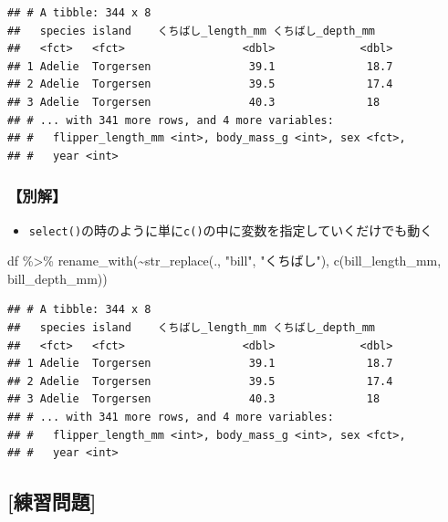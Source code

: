\documentclass[
  xelatex,ja=standard, b5paper]{bxjsbook}
\newenvironment{Shaded}{\begin{snugshade}}{\end{snugshade}}
\newcommand{\FunctionTok}[1]{\textcolor[rgb]{0.00,0.00,0.00}{#1}}
\newcommand{\NormalTok}[1]{#1}
\newcommand{\SpecialCharTok}[1]{\textcolor[rgb]{0.00,0.00,0.00}{#1}}
\newcommand{\StringTok}[1]{\textcolor[rgb]{0.31,0.60,0.02}{#1}}
\providecommand{\tightlist}{%
  \setlength{\itemsep}{0pt}\setlength{\parskip}{0pt}}
\begin{document}
\begin{verbatim}
## # A tibble: 344 x 8
##   species island    くちばし_length_mm くちばし_depth_mm
##   <fct>   <fct>                  <dbl>             <dbl>
## 1 Adelie  Torgersen               39.1              18.7
## 2 Adelie  Torgersen               39.5              17.4
## 3 Adelie  Torgersen               40.3              18  
## # ... with 341 more rows, and 4 more variables:
## #   flipper_length_mm <int>, body_mass_g <int>, sex <fct>,
## #   year <int>
\end{verbatim}

\hypertarget{rename-strreplace1-other}{%
\subsubsection{【別解】}\label{rename-strreplace1-other}}

\begin{itemize}
\tightlist
\item
  \texttt{select()}の時のように単に\texttt{c()}の中に変数を指定していくだけでも動く
\end{itemize}

\begin{Shaded}
\begin{Highlighting}[]
\NormalTok{df }\SpecialCharTok{\%\textgreater{}\%} 
  \FunctionTok{rename\_with}\NormalTok{(}\SpecialCharTok{\textasciitilde{}}\FunctionTok{str\_replace}\NormalTok{(., }\StringTok{"bill"}\NormalTok{, }\StringTok{"くちばし"}\NormalTok{),}
              \FunctionTok{c}\NormalTok{(bill\_length\_mm, bill\_depth\_mm))}
\end{Highlighting}
\end{Shaded}

\begin{verbatim}
## # A tibble: 344 x 8
##   species island    くちばし_length_mm くちばし_depth_mm
##   <fct>   <fct>                  <dbl>             <dbl>
## 1 Adelie  Torgersen               39.1              18.7
## 2 Adelie  Torgersen               39.5              17.4
## 3 Adelie  Torgersen               40.3              18  
## # ... with 341 more rows, and 4 more variables:
## #   flipper_length_mm <int>, body_mass_g <int>, sex <fct>,
## #   year <int>
\end{verbatim}

\hypertarget{ux7df4ux7fd2ux554fux984c-3}{%
\subsection{{[}練習問題{]}}\label{ux7df4ux7fd2ux554fux984c-3}}
\end{document}
